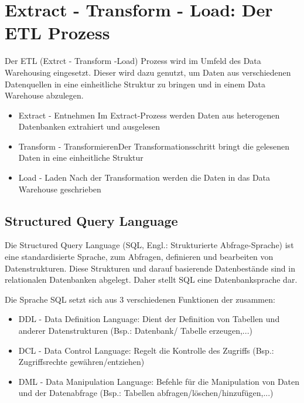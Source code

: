 \chapter{Extract - Transform - Load: Der ETL Prozess}
Der ETL (Extrct - Transform -Load) Prozess wird im Umfeld des Data Warehousing eingesetzt. Dieser wird dazu genutzt, um Daten aus verschiedenen Datenquellen in eine einheitliche Struktur zu bringen und in einem Data Warehouse abzulegen. 
\begin{itemize}
	\item {Extract - Entnehmen} \newline Im Extract-Prozess werden Daten aus heterogenen Datenbanken extrahiert und ausgelesen
	\item {Transform - Transformieren}\newline Der Transformationsschritt bringt die gelesenen Daten in eine einheitliche Struktur
	\item {Load - Laden}\newline
	Nach der Transformation werden die Daten in das Data Warehouse geschrieben
\end{itemize}
\section{Structured Query Language}
Die Structured Query Language (SQL, Engl.: Strukturierte Abfrage-Sprache) ist eine standardisierte Sprache, zum Abfragen, definieren und bearbeiten von Datenstrukturen. Diese Strukturen und darauf basierende Datenbestände sind in relationalen Datenbanken abgelegt. Daher stellt SQL eine Datenbanksprache dar. 

Die Sprache SQL setzt sich aus 3 verschiedenen Funktionen der zusammen:
\begin{itemize}
	\item {DDL - Data Definition Language:}\newline
	Dient der Definition von Tabellen und anderer Datenstrukturen (Bsp.: Datenbank/ Tabelle erzeugen,...)
	\item {DCL - Data Control Language:}\newline
	Regelt die Kontrolle des Zugriffs (Bsp.: Zugriffsrechte gewähren/entziehen)
	\item {DML - Data Manipulation Language:}\newline
	Befehle für die Manipulation von Daten und der Datenabfrage (Bsp.: Tabellen abfragen/löschen/hinzufügen,...)
\end{itemize}

